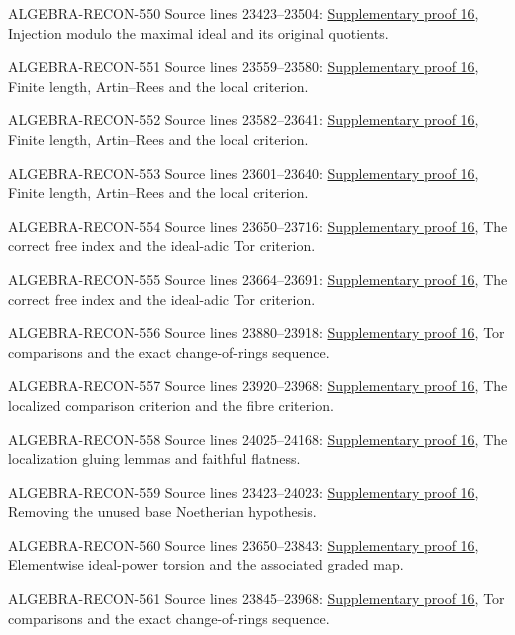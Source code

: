 \begin{AlgebraSourceRoutes}
\item[ALGEBRA-RECON-550] Source lines 23423--23504: \hyperlink{algebra_flatness_criteria_notes_20260928}{Supplementary proof 16}, Injection modulo the maximal ideal and its original quotients.
\item[ALGEBRA-RECON-551] Source lines 23559--23580: \hyperlink{algebra_flatness_criteria_notes_20260928}{Supplementary proof 16}, Finite length, Artin--Rees and the local criterion.
\item[ALGEBRA-RECON-552] Source lines 23582--23641: \hyperlink{algebra_flatness_criteria_notes_20260928}{Supplementary proof 16}, Finite length, Artin--Rees and the local criterion.
\item[ALGEBRA-RECON-553] Source lines 23601--23640: \hyperlink{algebra_flatness_criteria_notes_20260928}{Supplementary proof 16}, Finite length, Artin--Rees and the local criterion.
\item[ALGEBRA-RECON-554] Source lines 23650--23716: \hyperlink{algebra_flatness_criteria_notes_20260928}{Supplementary proof 16}, The correct free index and the ideal-adic Tor criterion.
\item[ALGEBRA-RECON-555] Source lines 23664--23691: \hyperlink{algebra_flatness_criteria_notes_20260928}{Supplementary proof 16}, The correct free index and the ideal-adic Tor criterion.
\item[ALGEBRA-RECON-556] Source lines 23880--23918: \hyperlink{algebra_flatness_criteria_notes_20260928}{Supplementary proof 16}, Tor comparisons and the exact change-of-rings sequence.
\item[ALGEBRA-RECON-557] Source lines 23920--23968: \hyperlink{algebra_flatness_criteria_notes_20260928}{Supplementary proof 16}, The localized comparison criterion and the fibre criterion.
\item[ALGEBRA-RECON-558] Source lines 24025--24168: \hyperlink{algebra_flatness_criteria_notes_20260928}{Supplementary proof 16}, The localization gluing lemmas and faithful flatness.
\item[ALGEBRA-RECON-559] Source lines 23423--24023: \hyperlink{algebra_flatness_criteria_notes_20260928}{Supplementary proof 16}, Removing the unused base Noetherian hypothesis.
\item[ALGEBRA-RECON-560] Source lines 23650--23843: \hyperlink{algebra_flatness_criteria_notes_20260928}{Supplementary proof 16}, Elementwise ideal-power torsion and the associated graded map.
\item[ALGEBRA-RECON-561] Source lines 23845--23968: \hyperlink{algebra_flatness_criteria_notes_20260928}{Supplementary proof 16}, Tor comparisons and the exact change-of-rings sequence.
\end{AlgebraSourceRoutes}

